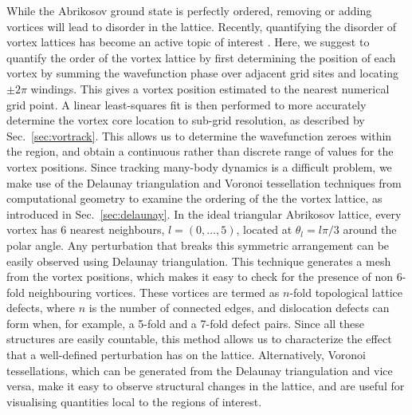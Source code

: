 While the Abrikosov ground state is perfectly ordered, removing or adding vortices will lead to disorder in the lattice. Recently, quantifying the disorder of vortex lattices has become an active topic of interest \cite{VTX:Mithun_pra_2016,VTX:Rankonjac_pra_2016}. %
Here, we suggest to quantify the order of the vortex lattice by first determining the position of each vortex by summing the wavefunction phase over adjacent grid sites and locating $\pm 2\pi$ windings. This gives a vortex position estimated to the nearest numerical grid point. A linear least-squares fit is then performed to more accurately determine the vortex core location to sub-grid resolution, as described by Sec.~\ref{sec:vortrack}. This allows us to determine the wavefunction zeroes within the region, and obtain a continuous rather than discrete range of values for the vortex positions. Since tracking many-body dynamics is a difficult problem, we make use of the Delaunay triangulation and Voronoi tessellation techniques from computational geometry to examine the ordering of the the vortex lattice, as introduced in Sec.~\ref{sec:delaunay}. In the ideal triangular Abrikosov lattice, every vortex has 6 nearest neighbours, $l=(0,\ldots,5)$, located at $\theta_l=l\pi/3$ around the polar angle. Any perturbation that breaks this symmetric arrangement can be easily observed using Delaunay triangulation. This technique generates a mesh from the vortex positions, which makes it easy to check for the presence of non 6-fold neighbouring vortices. These vortices are termed as $n$-fold topological lattice defects, where $n$ is the number of connected edges, and dislocation defects can form when, for example, a 5-fold and a 7-fold defect pairs. Since all these structures are easily countable, this method allows us to characterize the effect that a well-defined perturbation has on the lattice. Alternatively, Voronoi tessellations, which can be generated from the Delaunay triangulation and vice versa, make it easy to observe structural changes in the lattice, and are useful for visualising quantities local to the regions of interest.

